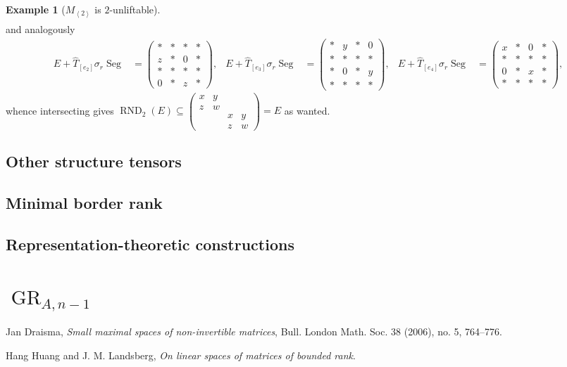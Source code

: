 \documentclass[a4paper,10pt]{article}
\def\gener#1{\left\langle#1\right\rangle}
\def\mtrx#1{\begin{pmatrix}#1\end{pmatrix}}
\DeclareMathOperator{\RND}{RND}
\DeclareMathOperator{\Seg}{Seg}
\DeclareMathOperator{\GR}{GR}
\theoremstyle{definition}
\newtheorem{example}[theorem]{Example}
\theoremstyle{remark}
\begin{document}
\begin{example}[$M_{\gener2}$ is $2$-unliftable]
\begin{align*}
    \end{align*}
    and analogously
    \begin{align*}
        E+\hat T_{[e_2]}\sigma_r\Seg &= \mtrx{
            *&*&*&*\\
            z&*&0&*\\
            *&*&*&*\\
            0&*&z&*
        },&
        E+\hat T_{[e_3]}\sigma_r\Seg &= \mtrx{
            *&y&*&0\\
            *&*&*&*\\
            *&0&*&y\\
            *&*&*&*
        },&
        E+\hat T_{[e_4]}\sigma_r\Seg &= \mtrx{
            x&*&0&*\\
            *&*&*&*\\
            0&*&x&*\\
            *&*&*&*
        },
    \end{align*}
    whence intersecting gives $\RND_2(E)\subseteq \mtrx{x&y&&\\z&w&&\\&&x&y\\&&z&w} = E$ as wanted.
\end{example}


\subsection{Other structure tensors}

\subsection{Minimal border rank}

\subsection{Representation-theoretic constructions}





\section{$\GR_{A,n-1}$}






\begin{thebibliography}{99}
    Jan Draisma,
    \textit{Small maximal spaces of non-invertible matrices},
    Bull. London Math. Soc. 38 (2006), no. 5,
    764--776.

    Hang Huang and J. M. Landsberg,
    \textit{On linear spaces of matrices of bounded rank}.

\end{thebibliography}
\end{document}
